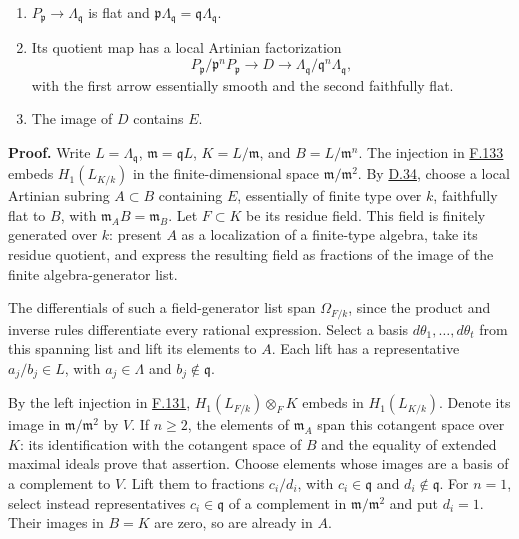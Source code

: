 \documentclass[11pt,a4paper,openany]{report}
\providecommand{\tightlist}{\setlength{\itemsep}{0pt}\setlength{\parskip}{0pt}}
\begin{document}
\begin{enumerate}
\def\labelenumi{\arabic{enumi}.}
\tightlist
\item
  \(P_{\mathfrak p}\to\Lambda_{\mathfrak q}\) is flat and \(\mathfrak p\Lambda_{\mathfrak q}=\mathfrak q\Lambda_{\mathfrak q}\).
\item
  Its quotient map has a local Artinian factorization \[
  P_{\mathfrak p}/\mathfrak p^nP_{\mathfrak p}
  \longrightarrow D\longrightarrow
  \Lambda_{\mathfrak q}/\mathfrak q^n\Lambda_{\mathfrak q},
  \] with the first arrow essentially smooth and the second faithfully flat.
\item
  The image of \(D\) contains \(E\).
\end{enumerate}

\textbf{Proof.} Write \(L=\Lambda_{\mathfrak q}\), \(\mathfrak m=\mathfrak qL\), \(K=L/\mathfrak m\), and \(B=L/\mathfrak m^n\). The injection in \hyperref[AG-RG-S05-more-algebra-proposition-characterization-geometrically-regular]{F.133} embeds \(H_1(L_{K/k})\) in the finite-dimensional space \(\mathfrak m/\mathfrak m^2\). By \hyperref[AG-RG-S05-smoothing-lemma-helper]{D.34}, choose a local Artinian subring \(A\subset B\) containing \(E\), essentially of finite type over \(k\), faithfully flat to \(B\), with \(\mathfrak m_AB=\mathfrak m_B\). Let \(F\subset K\) be its residue field. This field is finitely generated over \(k\): present \(A\) as a localization of a finite-type algebra, take its residue quotient, and express the resulting field as fractions of the image of the finite algebra-generator list.

The differentials of such a field-generator list span \(\Omega_{F/k}\), since the product and inverse rules differentiate every rational expression. Select a basis \(d\theta_1,\ldots,d\theta_t\) from this spanning list and lift its elements to \(A\). Each lift has a representative \(a_j/b_j\in L\), with \(a_j\in\Lambda\) and \(b_j\notin\mathfrak q\).

By the left injection in \hyperref[AG-RG-S05-more-algebra-lemma-transitivity-gamma]{F.131}, \(H_1(L_{F/k})\otimes_FK\) embeds in \(H_1(L_{K/k})\). Denote its image in \(\mathfrak m/\mathfrak m^2\) by \(V\). If \(n\ge2\), the elements of \(\mathfrak m_A\) span this cotangent space over \(K\): its identification with the cotangent space of \(B\) and the equality of extended maximal ideals prove that assertion. Choose elements whose images are a basis of a complement to \(V\). Lift them to fractions \(c_i/d_i\), with \(c_i\in\mathfrak q\) and \(d_i\notin\mathfrak q\). For \(n=1\), select instead representatives \(c_i\in\mathfrak q\) of a complement in \(\mathfrak m/\mathfrak m^2\) and put \(d_i=1\). Their images in \(B=K\) are zero, so are already in \(A\).
\end{document}
